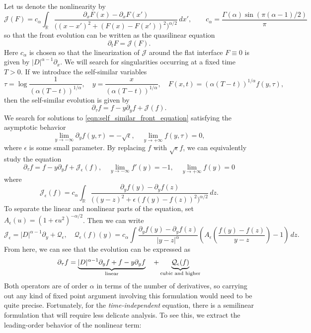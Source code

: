 \documentclass[11pt]{amsart}
\theoremstyle{definition}
\theoremstyle{remark}
\numberwithin{equation}{section}
\newcommand{\R}{\mathbb{R}}
\newcommand{\mc}[1]{\mathcal{#1}}
\begin{document}
Let us denote the nonlinearity by 
\[\mc{J}(F) = c_\alpha \int_{\R} \frac{\partial_x F(x) - \partial_x F(x')}{\big((x-x')^2+(F(x)-F(x'))^2\big)^{\alpha/2}}\,dx', \qquad c_\alpha = \frac{\Gamma(\alpha)\sin(\pi(\alpha-1)/2)}{\pi}\]
so that the front evolution can be written as the quasilinear equation
\[\partial_t F = \mc{J}(F).\]
Here $c_\alpha$ is chosen so that the linearization of $\mc{J}$ around the flat interface $F \equiv 0$ is given by $|D|^{\alpha - 1}\partial_x$. We will search for singularities occurring at a fixed time $T > 0$. If we introduce the self-similar variables
\[\tau = \log \frac{1}{(\alpha(T - t))^{1/\alpha}}, \quad y = \frac{x}{(\alpha(T - t))^{1/\alpha}}, \quad F(x, t) = (\alpha(T - t))^{1/\alpha}f(y, \tau),\]
then the self-similar evolution is given by 
\begin{equation}\label{eqn:self_similar_front_equation}
    \partial_\tau f = f - y\partial_yf + \mc{J}(f).
\end{equation}
We search for solutions to \cref{eqn:self_similar_front_equation} satisfying the asymptotic behavior 
\[\lim_{y \to - \infty} \partial_y f(y, \tau) = -\sqrt{\epsilon}, \quad \lim_{y \to + \infty} f(y, \tau) = 0,\]
where $\epsilon$ is some small parameter. By replacing $f$ with $\sqrt{\epsilon}f$, we can equivalently study the equation
\begin{equation}\label{eqn:self_similar_front_equation_scaled}
    \partial_\tau f = f - y\partial_yf + \mc{J}_\epsilon(f), \quad \lim_{y \to - \infty} f'(y) = -1, \quad \lim_{y \to + \infty} f(y) = 0
\end{equation}
where 
\[\mc{J}_\epsilon(f) = c_\alpha \int_{\R} \frac{\partial_y f(y) - \partial_y f(z)}{\big((y-z)^2+ \epsilon(f(y)-f(z))^2\big)^{\alpha/2}}\,dz.\]
To separate the linear and nonlinear parts of the equation, set $A_\epsilon(u) = (1 + \epsilon u^2)^{-\alpha / 2}$. Then we can write
\[\mc{J}_\epsilon = |D|^{\alpha - 1} \partial_y + \mc{Q}_\epsilon, \quad \mc{Q}_{\epsilon}(f)(y) = c_\alpha \int \frac{\partial_y f(y) - \partial_y f(z)}{|y - z|^\alpha}\left(A_\epsilon\left(\frac{f(y) - f(z)}{y - z}\right) - 1\right) \, dz.\]
From here, we can see that the evolution can be expressed as 
\[\partial_\tau f = \underbrace{|D|^{\alpha - 1} \partial_y f + f - y\partial_y f}_{\textup{linear}} \quad  + \underbrace{\mc{Q}_{\epsilon}(f)}_{\textup{cubic and higher}}\]
Both operators are of order $\alpha$ in terms of the number of derivatives, so carrying out any kind of fixed point argument involving this formulation would need to be quite precise. Fortunately, for the \emph{time-independent} equation, there is a semilinear formulation that will require less delicate analysis. To see this, we extract the leading-order behavior of the nonlinear term:
\end{document}
